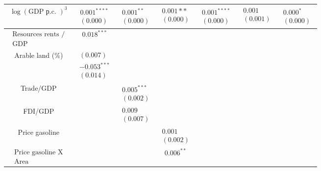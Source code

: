 \documentclass[10pt]{article}
\begin{document}
\begin{center}
\begin{tabular}{|c|c|c|c|c|c|c|}
\hline
$\log (\mathrm{GDP} \text { р.c. })^{3}$ & $\begin{array}{l}0.001^{* * * *} \\ (0.000)\end{array}$ & $\begin{array}{l}0.001^{* *} \\ (0.000)\end{array}$ & $\begin{array}{l}0.001 * * \\ (0.000)\end{array}$ & $\begin{array}{l}0.001^{* * * *} \\ (0.000)\end{array}$ & $\begin{array}{l}0.001 \\ (0.001)\end{array}$ & $\begin{array}{l}0.000^{*} \\ (0.000)\end{array}$ \\
\hline
$\begin{array}{l}\text { Resources rents / } \\ \text { GDP }\end{array}$ & $0.018^{* * *}$ &  &  &  &  &  \\
\hline
Arable land (\%) & $\begin{array}{l}(0.007) \\ -0.053^{* * *} \\ (0.014)\end{array}$ &  &  &  &  &  \\
\hline
Trade/GDP &  & $\begin{array}{l}0.005^{* * *} \\ (0.002)\end{array}$ &  &  &  &  \\
\hline
FDI/GDP &  & $\begin{array}{l}0.009 \\ (0.007)\end{array}$ &  &  &  &  \\
\hline
Price gasoline &  &  & $\begin{array}{l}0.001 \\ (0.002)\end{array}$ &  &  &  \\
\hline
$\begin{array}{l}\text { Price gasoline X } \\ \text { Area }\end{array}$ &  &  & $0.006^{* *}$ &  &  &  \\

\end{tabular}
\end{center}
\end{document}
